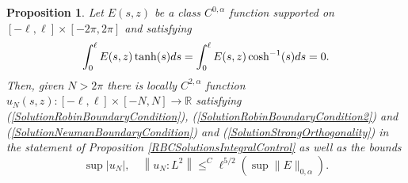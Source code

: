 \documentclass{amsart}
\newtheorem{proposition}{Proposition}
\newcommand{\mb}{\mathbb}
\begin{document}
 
  \begin{proposition} \label{StripInvertibilityWithRBC}
Let $E(s, z)$ be a class $C^{0, \alpha}$ function supported on $[-\ell, \ell] \times [- 2\pi, 2 \pi]$ and satisfying
\begin{align} \notag
\int_0^\ell E (s , z) \tanh(s) ds =  \int_0^\ell E (s , z) \cosh^{-1}(s) ds= 0.
\end{align}
Then, given $N > 2 \pi$ there is locally $C^{2, \alpha}$ function $u_N(s, z) : [- \ell, \ell] \times [-N, N] \rightarrow \mb{R}$ satisfying (\ref{SolutionRobinBoundaryCondition}),  (\ref{SolutionRobinBoundaryCondition2}) and  (\ref{SolutionNeumanBoundaryCondition}) and (\ref{SolutionStrongOrthogonality}) in the statement of Proposition \ref{RBCSolutionsIntegralControl} as well as the bounds
\[
\sup \left| u_N\right|, \quad \left\| u_N: L^2\right\| \leq^C \ell^{5/2} \left( \sup\| E\|_{0, \alpha} \right).
\]
 \end{proposition}
\end{document}
